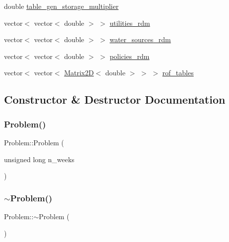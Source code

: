 \begin{DoxyCompactItemize}
\item 
double \mbox{\hyperlink{classProblem_a27cae146b3409021f6d5936404cd1083}{table\+\_\+gen\+\_\+storage\+\_\+multiplier}}
\item 
vector$<$ vector$<$ double $>$ $>$ \mbox{\hyperlink{classProblem_aa4f6db22580c8d8a941e83556f4f5208}{utilities\+\_\+rdm}}
\item 
vector$<$ vector$<$ double $>$ $>$ \mbox{\hyperlink{classProblem_ace43e5306285f0d91a199a4bd5a38922}{water\+\_\+sources\+\_\+rdm}}
\item 
vector$<$ vector$<$ double $>$ $>$ \mbox{\hyperlink{classProblem_a63d49161a5d6d98e26cd218d90a13bae}{policies\+\_\+rdm}}
\item 
vector$<$ vector$<$ \mbox{\hyperlink{classMatrix2D}{Matrix2D}}$<$ double $>$ $>$ $>$ \mbox{\hyperlink{classProblem_a0a64a8c04964a326879eccccf5437c93}{rof\+\_\+tables}}
\end{DoxyCompactItemize}


\subsection{Constructor \& Destructor Documentation}
\mbox{\label{classProblem_a41939e01b382197124fcd9f5e8c7520d}} 
\subsubsection{\texorpdfstring{Problem()}{Problem()}}
{\footnotesize\ttfamily Problem\+::\+Problem (\begin{DoxyParamCaption}\item[{unsigned long}]{n\+\_\+weeks }\end{DoxyParamCaption})}

\mbox{\label{classProblem_a839a525ed01c34d57fff42583003d3e7}} 
\subsubsection{\texorpdfstring{$\sim$\+Problem()}{~Problem()}}
{\footnotesize\ttfamily Problem\+::$\sim$\+Problem (\begin{DoxyParamCaption}{ }\end{DoxyParamCaption})\hspace{0.3cm}{\ttfamily [virtual]}}



